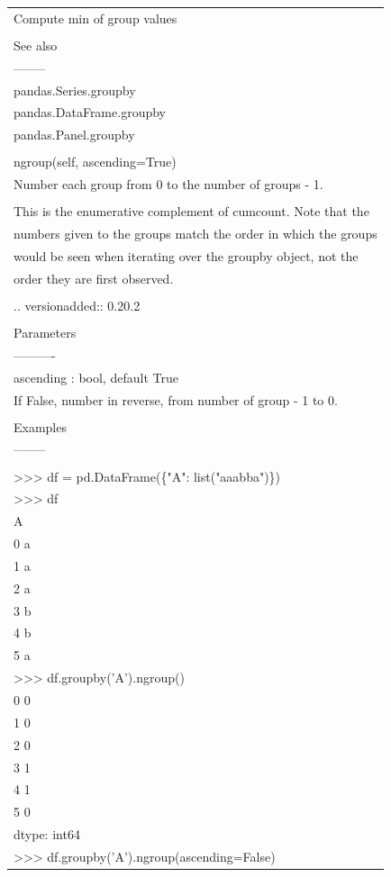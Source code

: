 \documentclass[11pt]{article}
\begin{document}
\begin{enumerate}
\begin{enumerate}
\begin{enumerate}
\begin{center}
\begin{tabular}{l}
Compute min of group values\\
\\
See also\\
--------\\
pandas.Series.groupby\\
pandas.DataFrame.groupby\\
pandas.Panel.groupby\\
\\
ngroup(self, ascending=True)\\
Number each group from 0 to the number of groups - 1.\\
\\
This is the enumerative complement of cumcount.  Note that the\\
numbers given to the groups match the order in which the groups\\
would be seen when iterating over the groupby object, not the\\
order they are first observed.\\
\\
.. versionadded:: 0.20.2\\
\\
Parameters\\
----------\\
ascending : bool, default True\\
If False, number in reverse, from number of group - 1 to 0.\\
\\
Examples\\
--------\\
\\
>>> df = pd.DataFrame(\{"A": list("aaabba")\})\\
>>> df\\
A\\
0  a\\
1  a\\
2  a\\
3  b\\
4  b\\
5  a\\
>>> df.groupby('A').ngroup()\\
0    0\\
1    0\\
2    0\\
3    1\\
4    1\\
5    0\\
dtype: int64\\
>>> df.groupby('A').ngroup(ascending=False)\\

\end{tabular}
\end{center}
\end{enumerate}
\end{enumerate}
\end{enumerate}
\end{document}
